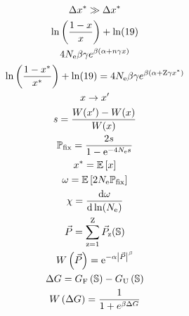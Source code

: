 \documentclass{article}
\begin{document}
\begin{gather*}
\Delta  x^{*} \gg \Delta  x^{*} \\
\ln \left( \frac{1 - x}{x} \right) + \ln (19) \\
4N_{\text{e}} \beta \gamma e^{\beta (\alpha + n \gamma x)}\\
\ln \left( \frac{1 - x^{*}}{x^{*}} \right) + \ln (19) = 4N_{\text{e}} \beta \gamma e^{\beta (\alpha + \text{Z} \gamma x^{*})}\\
x \rightarrow x' \\
s = \frac{W(x') - W(x)}{W( x)} \\
\mathbb{P}_{\text{fix}} = \frac{ 2 s}{1 - \text{e}^{-4N_{\text{e}} s}} \\
x^{*} = \operatorname{\mathbb{E}} \left[ x \right] \\
\omega = \operatorname{\mathbb{E}} \left[ 2 N_{\text{e}} \mathbb{P}_{\text{fix}} \right]\\
\chi = \frac{ \mathrm{d} \omega}{\mathrm{d} \ln (N_{\text{e}})} \\
\vec{P} = \sum\limits_{\text{z}=1}^{\text{Z}} \vec{P}_{\text{z}}(\mathbb{S}) \\
W\left( \vec{P} \right) = \text{e}^{-\alpha \left| \vec{P} \right|^{\beta}}\\
\Delta G = G_{\text{F}} \left(\mathbb{S}\right) - G_{\text{U}} \left(\mathbb{S}\right) \\
W\left( \Delta G \right) = \dfrac{1}{1 + e^{\beta \Delta G }}\\
\end{gather*}
\end{document}
